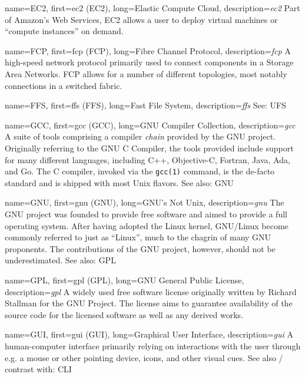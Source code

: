 {
	name={EC2},
	first={\acrlong{ec2} (EC2)},
	long={Elastic Compute Cloud},
	description={{\em \acrlong{ec2}} Part of Amazon's Web Services, EC2
allows a user to deploy virtual machines or ``compute instances'' on
demand.}
}

{
	name={FCP},
	first={\acrlong{fcp} (FCP)},
	long={Fibre Channel Protocol},
	description={{\em \acrlong{fcp}} A high-speed network protocol
primarily used to connect components in a Storage Area Networks.  FCP
allows for a number of different topologies, most notably connections in a
switched fabric.}
}

{
	name={FFS},
	first={\acrlong{ffs} (FFS)},
	long={Fast File System},
	description={{\em \acrlong{ffs}} See: UFS}
}

{
	name={GCC},
	first={\acrlong{gcc} (GCC)},
	long={GNU Compiler Collection},
	description={{\em \acrlong{gcc}} A suite of
tools comprising a compiler {\em chain} provided by
the GNU project.  Originally referring to the GNU C
Compiler, the tools provided include support for many
different languages, including C++, Objective-C,
Fortran, Java, Ada, and Go.  The C compiler, invoked via the
{\tt gcc(1)} command, is the de-facto standard and
is shipped with most Unix flavors. See also: GNU}
}

{
	name={GNU},
	first={\acrlong{gnu} (GNU)},
	long={GNU's Not Unix},
	description={{\em \acrlong{gnu}} The GNU project was founded to provide free
software and aimed to provide a full operating system.  After having
adopted the Linux kernel, GNU/Linux become commonly referred to just as
``Linux'', much to the chagrin of many GNU proponents.  The contributions
of the GNU project, however, should not be
underestimated.  See also: GPL}
}

{
	name={GPL},
	first={\acrlong{gpl} (GPL)},
	long={GNU General Public License},
	description={{\em \acrlong{gpl}} A widely used free software license
originally written by Richard Stallman for the GNU Project.  The license
aims to guarantee availability of the source code for the licensed
software as well as any derived works.}
}

{
	name={GUI},
	first={\acrlong{gui} (GUI)},
	long={Graphical User Interface},
	description={{\em \acrlong{gui}} A
human-computer interface primarily relying on
interactions with the user through e.g. a mouse or
other pointing device, icons, and other visual cues.
See also / contrast with: CLI}
}

